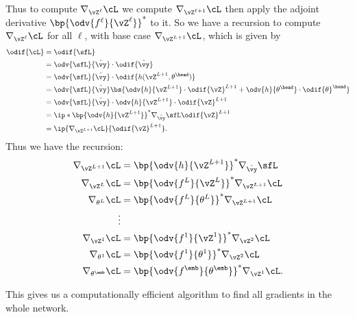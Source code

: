 \documentclass[../../book-main.tex]{subfiles}
\begin{document}
Thus to compute \(\nabla_{\vZ^{\ell}}\cL\) we compute
\(\nabla_{\vZ^{\ell + 1}}\cL\) then apply the adjoint derivative
\(\bp{\odv{f^{\ell}}{\vZ^{\ell}}}^{*}\) to it. So we have a recursion
to compute \(\nabla_{\vZ^{\ell}}\cL\) for all \(\ell\), with base
case \(\nabla_{\vZ^{L + 1}}\cL\), which is given by
\begin{align}
    \odif{\cL}
    &= \odif{\sfL} \\
    &= \odv{\sfL}{\hat{\vy}}\cdot\odif{\hat{\vy}} \\
    &= \odv{\sfL}{\hat{\vy}}\cdot\odif{{h(\vZ^{L + 1}, \theta^{\head})}} \\
    &= \odv{\sfL}{\hat{\vy}}\bs{\odv{h}{\vZ^{L +
        1}}\cdot\odif{\vZ}^{L + 1} +
    \odv{h}{\theta^{\head}}\cdot\odif{\theta}^{\head}} \\
    &= \odv{\sfL}{\hat{\vy}}\cdot \odv{h}{\vZ^{L + 1}}\cdot\odif{\vZ}^{L + 1} \\
    &= \ip*{\bp{\odv{h}{\vZ^{L +
    1}}}^{*}\nabla_{\hat{\vy}}\sfL}{\odif{\vZ}^{L + 1}} \\
    &= \ip{\nabla_{\vZ^{L + 1}}\cL}{\odif{\vZ}^{L + 1}}.
\end{align}
Thus we have the recursion:
\begin{align}
    \nabla_{\vZ^{L + 1}}\cL
    &= \bp{\odv{h}{\vZ^{L + 1}}}^{*}\nabla_{\hat{\vy}}\sfL \\
    \nabla_{\vZ^{L}}\cL
    &= \bp{\odv{f^{L}}{\vZ^{L}}}^{*}\nabla_{\vZ^{L + 1}}\cL \\
    \nabla_{\theta^{L}}\cL
    &= \bp{\odv{f^{L}}{\theta^{L}}}^{*}\nabla_{\vZ^{L + 1}}\cL \\
    \vdots &  \\
    \nabla_{\vZ^{1}}\cL
    &= \bp{\odv{f^{1}}{\vZ^{1}}}^{*}\nabla_{\vZ^{2}}\cL \\
    \nabla_{\theta^{1}}\cL
    &= \bp{\odv{f^{1}}{\theta^{1}}}^{*}\nabla_{\vZ^{2}}\cL \\
    \nabla_{\theta^{\emb}}\cL
    &= \bp{\odv{f^{\emb}}{\theta^{\emb}}}^{*}\nabla_{\vZ^{1}}\cL.
\end{align}

This gives us a computationally efficient algorithm to find all
gradients in the whole network.
\end{document}
